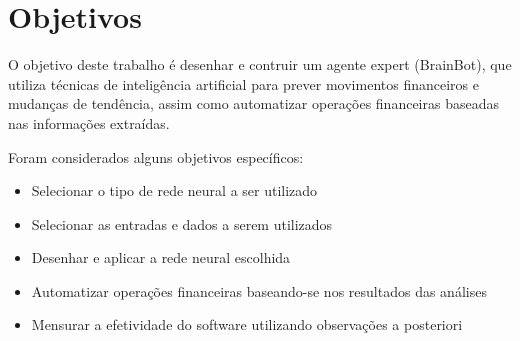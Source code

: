 \section{Objetivos}

O objetivo deste trabalho é desenhar e contruir um agente expert (BrainBot), que utiliza técnicas de inteligência artificial para prever
movimentos financeiros e mudanças de tendência, assim como automatizar operações financeiras baseadas nas informações extraídas.

Foram considerados alguns objetivos específicos:

\begin{itemize}
  \item Selecionar o tipo de rede neural a ser utilizado
  \item Selecionar as entradas e dados a serem utilizados
  \item Desenhar e aplicar a rede neural escolhida
  \item Automatizar operações financeiras baseando-se nos resultados das análises
  \item Mensurar a efetividade do software utilizando observações a posteriori
\end{itemize}



